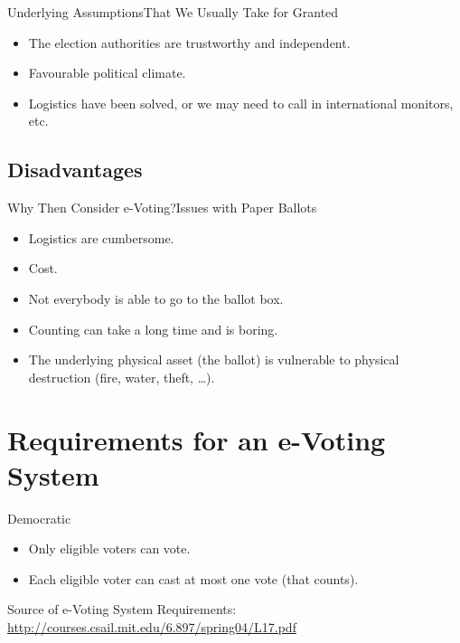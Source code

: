 \documentclass[utf8]{beamer}
\begin{document}
\begin{frame}{Underlying Assumptions}{That We Usually Take for Granted}

  \begin{itemize}
  \item<1->The election authorities are trustworthy and independent.
  \item<2->Favourable political climate.
  \item<3->Logistics have been solved,  or we may need to call in
    international monitors, etc.
  \end{itemize}

\end{frame}

\subsection{Disadvantages}

\begin{frame}{Why Then Consider e-Voting?}{Issues with Paper Ballots}

  \begin{itemize}
  \item Logistics are cumbersome.
  \item Cost.
  \item Not everybody is able to go to the ballot box.
  \item Counting can take a long time and is boring.
  \item The underlying physical asset (the ballot) is vulnerable to
    physical destruction (fire, water, theft, \ldots).
  \end{itemize}

\end{frame}

\section{Requirements for an e-Voting System}

\begin{frame}{Democratic}

  \begin{itemize}
  \item Only eligible voters can vote.
  \item Each eligible voter can cast at most one vote (that counts).
  \end{itemize}

\vfill
{\tiny
Source of e-Voting System Requirements:
\url{http://courses.csail.mit.edu/6.897/spring04/L17.pdf}
}
\end{frame}
\end{document}
